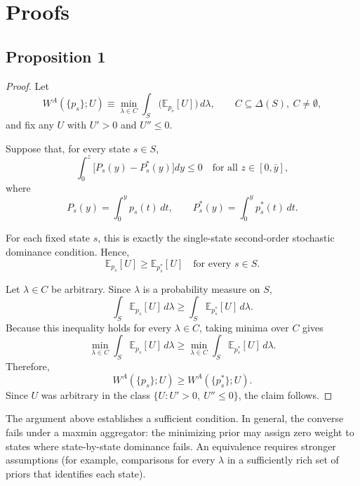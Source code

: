 \documentclass[../../../00-main.tex]{subfiles}
\begin{document}
\section{Proofs}
\label{app:DF_R}

\subsection{Proposition 1}

\begin{proof}

\par Let
\[
W^{A}(\{p_s\};U) \equiv \min_{\lambda \in C} \int_S \big(\mathbb{E}_{p_s}[U]\big)\,d\lambda,
\qquad C \subseteq \Delta(S),\ C\neq\emptyset,
\]
and fix any $U$ with $U' > 0$ and $U'' \leq 0$.

\par Suppose that, for every state $s \in S$,
\[
\int_0^z \big[P_s(y)-P_s^*(y)\big]dy \le 0
\quad\text{for all } z\in[0,\bar y],
\]
where
\[
P_s(y)=\int_0^y p_s(t)\,dt,
\qquad
P_s^*(y)=\int_0^y p_s^*(t)\,dt.
\]

\par For each fixed state $s$, this is exactly the single-state second-order stochastic dominance condition. Hence,
\[
\mathbb{E}_{p_s}[U] \ge \mathbb{E}_{p_s^*}[U]
\quad\text{for every } s\in S.
\]

\par Let $\lambda\in C$ be arbitrary. Since $\lambda$ is a probability measure on $S$,
\[
\int_S \mathbb{E}_{p_s}[U] \, d\lambda
\ge
\int_S \mathbb{E}_{p_s^*}[U] \, d\lambda.
\]
Because this inequality holds for every $\lambda\in C$, taking minima over $C$ gives
\[
\min_{\lambda\in C}\int_S \mathbb{E}_{p_s}[U] \, d\lambda
\ge
\min_{\lambda\in C}\int_S \mathbb{E}_{p_s^*}[U] \, d\lambda.
\]
Therefore,
\[
W^{A}(\{p_s\};U) \ge W^{A}(\{p_s^*\};U).
\]
Since $U$ was arbitrary in the class $\{U: U'>0,\ U''\le 0\}$, the claim follows.

\end{proof}

\begin{remak}
The argument above establishes a sufficient condition. In general, the converse fails under a maxmin aggregator: the minimizing prior may assign zero weight to states where state-by-state dominance fails. An equivalence requires stronger assumptions (for example, comparisons for every $\lambda$ in a sufficiently rich set of priors that identifies each state).
\end{remak}
\end{document}
